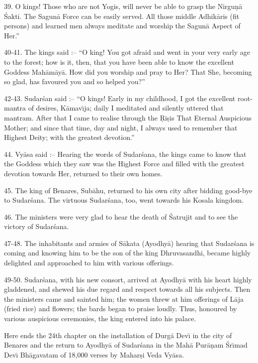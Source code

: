 39. O kings! Those who are not Yogis, will never be able to grasp the Nirgu\d{n}\=a \'Sakti. The Sagun\=a Force can be easily served. All those middle Adhik\=aris (fit persons) and learned men always meditate and worship the Sagun\=a Aspect of Her.''

40-41. The kings said :-- ``O king! You got afraid and went in your very early age to the forest; how is it, then, that you have been able to know the excellent Goddess Mah\=am\=ay\=a. How did you worship and pray to Her? That She, becoming so glad, has favoured you and so helped you?''

42-43. Sudar\'san said :-- ``O kings! Early in my childhood, I got the excellent root-mantra of desires, K\=amav\={\i}ja; daily I meditated and silently uttered that mantram. After that I came to realise through the \d{R}i\d{s}is That Eternal Auspicious Mother; and since that time, day and night, I always used to remember that Highest Deity; with the greatest devotion.''

44. Vy\=asa said :-- Hearing the words of Sudar\'sana, the kings came to know that the Goddess which they saw was the Highest Force and filled with the greatest devotion towards Her, returned to their own homes.

45. The king of Benares, Sub\=ahu, returned to his own city after bidding good-bye to Sudar\'sana. The virtuous Sudar\'sana, too, went towards his Kosala kingdom.

46. The ministers were very glad to hear the death of \'Satrujit and to see the victory of Sudar\'sana.

47-48. The inhabitants and armies of S\=akata (Ayodhy\=a) hearing that Sudar\'sana is coming and knowing him to be the son of the king Dhruvasandhi, became highly delighted and approached to him with various offerings.

49-50. Sudar\'sana, with his new consort, arrived at Ayodhy\=a with his heart highly gladdened, and shewed his due regard and respect towards all his subjects. Then the ministers came and sainted him; the women threw at him offerings of L\=aja (fried rice) and flowers; the bards began to praise loudly. Thus, honoured by various auspicious ceremonies, the king entered into his palace.

Here ends the 24th chapter on the installation of Durg\=a Dev\={\i} in the city of Benares and the return to Ayodhy\=a of Sudar\'sana in the Mah\=a Pur\=a\d{n}am \'Sr\={\i}mad Dev\={\i} Bh\=agavatam of 18,000 verses by Mahar\d{s}i Veda Vy\=asa.




